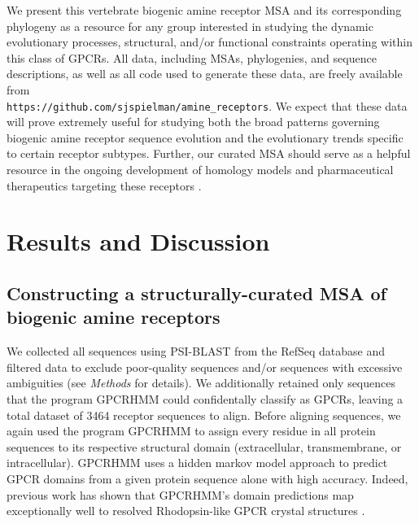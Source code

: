 \documentclass[fleqn,10pt]{wlpeerj}
\begin{document}
We present this vertebrate biogenic amine receptor MSA and its corresponding phylogeny as a resource for any group interested in studying the dynamic evolutionary processes, structural, and/or functional constraints operating within this class of GPCRs. All data, including MSAs, phylogenies, and sequence descriptions, as well as all code used to generate these data, are freely available from \\\texttt{https://github.com/sjspielman/amine\_receptors}. We expect that these data will prove extremely useful for studying both the broad patterns governing biogenic amine receptor sequence evolution and the evolutionary trends specific to certain receptor subtypes. Further, our curated MSA should serve as a helpful resource in the ongoing development of homology models and pharmaceutical therapeutics targeting these receptors \citep{Kristiansen2004,Ishiguro2004,Eversetal2005,Masonetal2012}.




\section*{Results and Discussion}

\subsection*{Constructing a structurally-curated MSA of biogenic amine receptors}

We collected all sequences using PSI-BLAST from the RefSeq \citep{refseq} database and filtered data to exclude poor-quality sequences and/or sequences with excessive ambiguities (see \emph{Methods} for details). We additionally retained only sequences that the program GPCRHMM \citep{Wistrand2006} could confidentally classify as GPCRs, leaving a total dataset of 3464 receptor sequences to align. Before aligning sequences, we again used the program GPCRHMM \citep{Wistrand2006} to assign every residue in all protein sequences to its respective structural domain (extracellular, transmembrane, or intracellular). GPCRHMM uses a hidden markov model approach to predict GPCR domains from a given protein sequence alone with high accuracy. Indeed, previous work has shown that GPCRHMM's domain predictions map exceptionally well to resolved Rhodopsin-like GPCR crystal structures \citep{SpielmanWilke2013}. 
\end{document}
